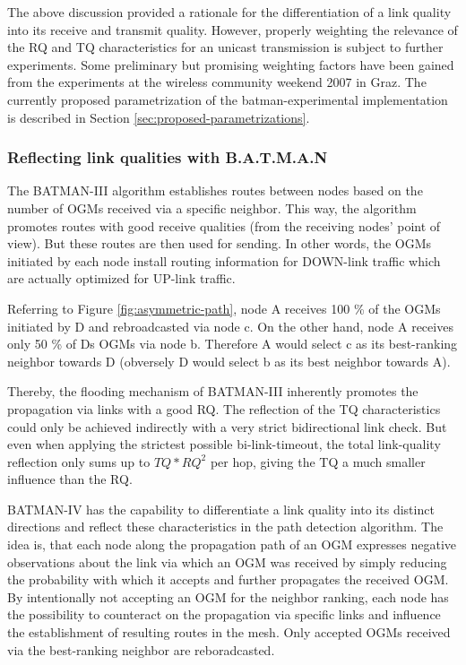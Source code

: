 \documentclass[11pt]{article}
\begin{document}
The above discussion provided a rationale for the differentiation of a link quality into its receive and transmit quality. 
%
However, properly weighting the relevance of the RQ and TQ characteristics for an unicast transmission is subject to further experiments. %
Some preliminary but promising weighting factors have been gained from the experiments at the wireless community weekend 2007 in Graz. 
%
The currently proposed parametrization of the batman-experimental implementation is described in Section \ref{sec:proposed-parametrizations}.


%
\subsubsection{Reflecting link qualities with B.A.T.M.A.N}
\label{sec:batman-link-reflection}

The BATMAN-III algorithm establishes routes between nodes based on the number of OGMs  received via a specific neighbor. 
%
This way, the algorithm promotes routes with good receive qualities (from the receiving nodes' point of view). But these routes are then used for sending. 
%
In other words, the OGMs initiated by each node install routing information for DOWN-link traffic which are actually optimized for UP-link traffic. 

Referring to Figure \ref{fig:asymmetric-path}, node A receives 100 \% of the OGMs initiated by D and rebroadcasted via node c. 
%
On the other hand, node A receives only 50 \% of Ds OGMs via node b. 
%
Therefore A would select c as its best-ranking neighbor towards D (obversely D would select b as its best neighbor towards A).

Thereby, the flooding mechanism of BATMAN-III inherently promotes the propagation via links with a good RQ. The reflection of the TQ characteristics could only be achieved indirectly with a very strict bidirectional link check. 
%
But even when applying the strictest possible bi-link-timeout, the total link-quality reflection only sums up to $ TQ * RQ^2 $ per hop, giving the TQ a much smaller influence than the RQ.

BATMAN-IV has the capability to differentiate a link quality into its distinct directions and reflect these characteristics in the path detection algorithm.
%
The idea is, that each node along the propagation path of an OGM expresses negative observations about the link via which an OGM was received by simply reducing the probability with which it accepts and further propagates the received OGM.
%
By intentionally not accepting an OGM for the neighbor ranking, each node has the possibility to counteract on the propagation via specific links and influence the establishment of resulting routes in the mesh.
Only accepted OGMs received via the best-ranking neighbor are reboradcasted.
\end{document}
